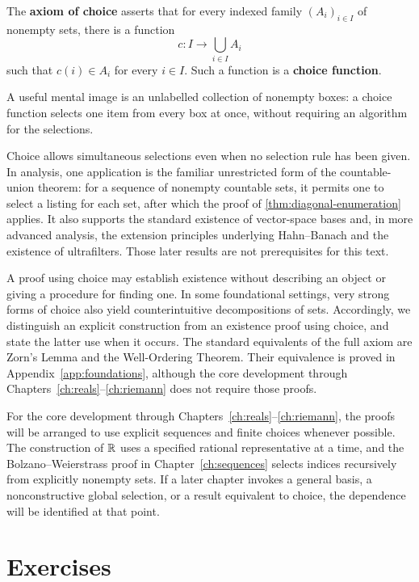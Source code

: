 \begin{definition}
The \textbf{axiom of choice} asserts that for every indexed family $(A_i)_{i\in I}$ of nonempty sets, there is a function
\[
c:I\to\bigcup_{i\in I}A_i
\]
such that $c(i)\in A_i$ for every $i\in I$. Such a function is a \textbf{choice function}.
\end{definition}

A useful mental image is an unlabelled collection of nonempty boxes: a choice function selects one item from every box at once, without requiring an algorithm for the selections.

Choice allows simultaneous selections even when no selection rule has been given. In analysis, one application is the familiar unrestricted form of the countable-union theorem: for a sequence of nonempty countable sets, it permits one to select a listing for each set, after which the proof of \cref{thm:diagonal-enumeration} applies. It also supports the standard existence of vector-space bases and, in more advanced analysis, the extension principles underlying Hahn--Banach and the existence of ultrafilters. Those later results are not prerequisites for this text.

A proof using choice may establish existence without describing an object or giving a procedure for finding one. In some foundational settings, very strong forms of choice also yield counterintuitive decompositions of sets. Accordingly, we distinguish an explicit construction from an existence proof using choice, and state the latter use when it occurs. The standard equivalents of the full axiom are Zorn's Lemma and the Well-Ordering Theorem. Their equivalence is proved in Appendix~\ref{app:foundations}, although the core development through Chapters~\ref{ch:reals}--\ref{ch:riemann} does not require those proofs.

For the core development through Chapters~\ref{ch:reals}--\ref{ch:riemann}, the proofs will be arranged to use explicit sequences and finite choices whenever possible. The construction of $\mathbb{R}$ uses a specified rational representative at a time, and the Bolzano--Weierstrass proof in Chapter~\ref{ch:sequences} selects indices recursively from explicitly nonempty sets. If a later chapter invokes a general basis, a nonconstructive global selection, or a result equivalent to choice, the dependence will be identified at that point.




\section*{Exercises}

